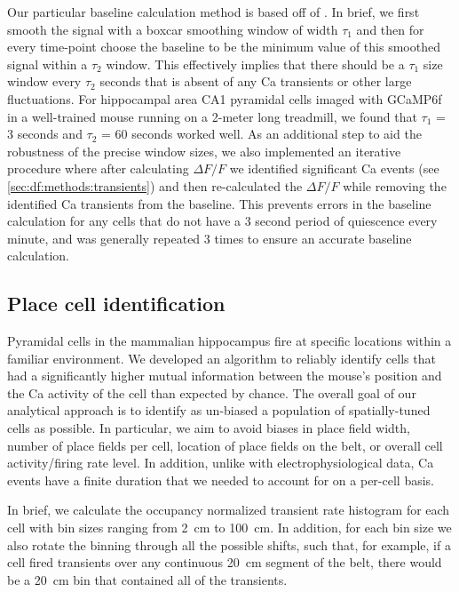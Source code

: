 Our particular baseline calculation method is based off of \citet{Jia2011}.
In brief, we first smooth the signal with a boxcar smoothing window of width $\tau_1$ and then for every time-point choose the baseline to be the minimum value of this smoothed signal within a $\tau_2$ window.
This effectively implies that there should be a $\tau_1$ size window every $\tau_2$ seconds that is absent of any Ca transients or other large fluctuations.
For hippocampal area CA1 pyramidal cells imaged with GCaMP6f in a well-trained mouse running on a 2-meter long treadmill, we found that $\tau_1$ = 3 seconds and $\tau_2$ = 60 seconds worked well.
As an additional step to aid the robustness of the precise window sizes, we also implemented an iterative procedure where after calculating $\Delta F/F$ we identified significant Ca events (see \autoref{sec:df:methods:transients}) and then re-calculated the $\Delta F/F$ while removing the identified Ca transients from the baseline.
This prevents errors in the baseline calculation for any cells that do not have a 3 second period of quiescence every minute, and was generally repeated 3 times to ensure an accurate baseline calculation.

\subsection{Place cell identification}
\label{sec:intro:techniques:pc_id}
Pyramidal cells in the mammalian hippocampus fire at specific locations within a familiar environment.
We developed an algorithm to reliably identify cells that had a significantly higher mutual information between the mouse's position and the Ca activity of the cell than expected by chance.
The overall goal of our analytical approach is to identify as un-­biased a population of spatially-­tuned cells as possible.
In particular, we aim to avoid biases in place  field width, number of place fields per cell, location of place fields on the belt, or overall cell activity/firing rate level.
In addition, unlike with electrophysiological data, Ca events have a finite duration that we needed to account for on a per-­cell basis.  

In brief, we calculate the occupancy normalized transient rate histogram for each cell with bin sizes ranging from 2~cm to 100~cm.
In addition, for each bin size we also rotate the binning through all the possible shifts, such that, for example, if a cell fired transients over any continuous 20~cm segment of the belt, there would be a 20~cm bin that contained all of the transients.

